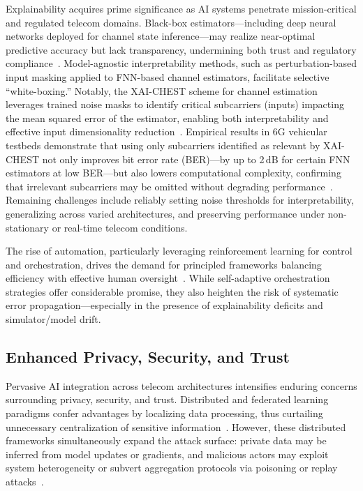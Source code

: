 \documentclass[sigconf]{acmart}
\begin{document}
Explainability acquires prime significance as AI systems penetrate mission-critical and regulated telecom domains. Black-box estimators—including deep neural networks deployed for channel state inference—may realize near-optimal predictive accuracy but lack transparency, undermining both trust and regulatory compliance~\cite{ref38}. Model-agnostic interpretability methods, such as perturbation-based input masking applied to FNN-based channel estimators, facilitate selective ``white-boxing.'' Notably, the XAI-CHEST scheme for channel estimation leverages trained noise masks to identify critical subcarriers (inputs) impacting the mean squared error of the estimator, enabling both interpretability and effective input dimensionality reduction~\cite{ref38,ref41}. Empirical results in 6G vehicular testbeds demonstrate that using only subcarriers identified as relevant by XAI-CHEST not only improves bit error rate (BER)—by up to 2\,dB for certain FNN estimators at low BER—but also lowers computational complexity, confirming that irrelevant subcarriers may be omitted without degrading performance~\cite{ref38,ref41}. Remaining challenges include reliably setting noise thresholds for interpretability, generalizing across varied architectures, and preserving performance under non-stationary or real-time telecom conditions.

The rise of automation, particularly leveraging reinforcement learning for control and orchestration, drives the demand for principled frameworks balancing efficiency with effective human oversight~\cite{ref37}. While self-adaptive orchestration strategies offer considerable promise, they also heighten the risk of systematic error propagation—especially in the presence of explainability deficits and simulator/model drift.

\subsection{Enhanced Privacy, Security, and Trust}

Pervasive AI integration across telecom architectures intensifies enduring concerns surrounding privacy, security, and trust. Distributed and federated learning paradigms confer advantages by localizing data processing, thus curtailing unnecessary centralization of sensitive information~\cite{ref17,ref18,ref19,ref23,ref24,ref26,ref48}. However, these distributed frameworks simultaneously expand the attack surface: private data may be inferred from model updates or gradients, and malicious actors may exploit system heterogeneity or subvert aggregation protocols via poisoning or replay attacks~\cite{ref10,ref20,ref21,ref23}.
\end{document}
